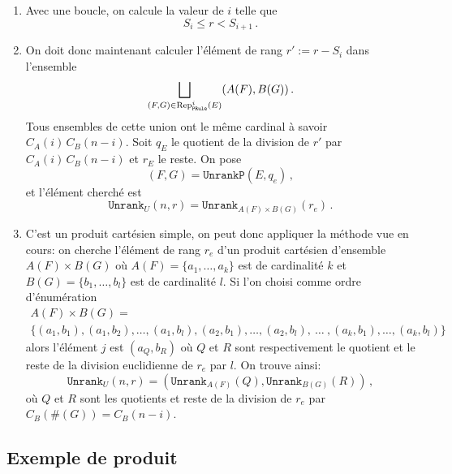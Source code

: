 \documentclass[11pt]{article}
\begin{document}
\begin{itemize}
  \begin{enumerate}
  \item Avec une boucle, on calcule la valeur de $i$ telle que
    \begin{equation}
      S_i \leq r < S_{i+1}\,.
    \end{equation}
  \item On doit donc maintenant calculer l'élément de rang $r' := r-S_i$ dans
    l'ensemble
    \begin{equation}
      \bigsqcup_{(F, G) \in\operatorname{Rep}_{\texttt{PRule}}^{i}(E)} (A(F), B(G))\,.
    \end{equation}
    Tous ensembles de cette union ont le même cardinal à savoir
    $C_A(i)\,C_B(n-i)$. Soit $q_E$ le quotient de la division de $r'$ par
    $C_A(i)\,C_B(n-i)$ et $r_E$ le reste. On pose
    \begin{equation}
      (F, G) = \texttt{UnrankP}(E,q_e)\,,
    \end{equation}
    et l'élément cherché est
    \begin{equation}
      \texttt{Unrank}_U(n,r) = \texttt{Unrank}_{A(F)\times B(G)}(r_e)\,.
    \end{equation}
  \item C'est un produit cartésien simple, on peut donc appliquer la méthode
    vue en cours: on cherche l'élément de rang $r_e$ d'un produit cartésien
    d'ensemble $A(F)\times B(G)$ où $A(F)=\{a_1,\dots,a_k\}$ est de
    cardinalité $k$ et $B(G)=\{b_1,\dots,b_l\}$ est de cardinalité $l$. Si
    l'on choisi comme ordre d'énumération
    \begin{multline*}
      A(F)\times B(G) = \\ \{(a_1, b_1), (a_1, b_2), \dots, (a_1, b_l), (a_2,
      b_1), \dots, (a_2, b_l), \ \dots\ , (a_k, b_1), \dots, (a_k, b_l)\}
    \end{multline*}
    alors l'élément $j$ est $(a_{Q}, b_{R})$ où $Q$ et $R$ sont respectivement
    le quotient et le reste de la division euclidienne de $r_e$ par $l$.
    On trouve ainsi:
    \begin{equation}
      \texttt{Unrank}_U(n,r) =
      \left(\texttt{Unrank}_{A(F)}(Q), \texttt{Unrank}_{B(G)}(R)\right)\,,
    \end{equation}
    où $Q$ et $R$ sont les quotients et reste de la division de $r_e$ par
    $C_B(\#(G)) = C_B(n-i)$.
  \end{enumerate}

\subsection{Exemple de produit}


\end{itemize}
\end{document}
